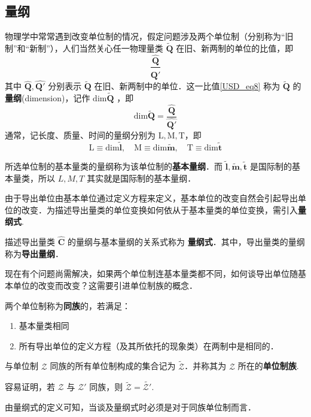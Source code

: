 \subsection{量纲}
物理学中常常遇到改变单位制的情况，假定问题涉及两个单位制（分别称为“旧制”和“新制”），人们当然关心任一物理量类 $\tilde{\boldsymbol{Q}}$ 在旧、新两制的单位的比值，即 
\begin{equation}\label{USD_eq8}
\frac{\hat{\boldsymbol{Q}}}{\hat{\boldsymbol{Q'}}}
\end{equation}
其中 $\hat{\boldsymbol{Q}},\hat{\boldsymbol{Q'}}$ 分别表示 $\tilde{\boldsymbol{Q}}$ 在旧、新两制中的单位．这一比值\autoref{USD_eq8} 称为 $\tilde{\boldsymbol{Q}}$ 的\textbf{量纲}(dimension)，记作 $\mathrm{dim}\tilde{\boldsymbol{Q}}$ ，即
\begin{equation}\label{USD_eq9}
\mathrm{dim}\tilde{\boldsymbol{Q}}=\frac{\hat{\boldsymbol{Q}}}{\hat{\boldsymbol{Q'}}}
\end{equation}
通常，记长度、质量、时间的量纲分别为 $\mathrm{L},\mathrm{M},\mathrm{T}$，即
\begin{equation}
\mathrm{L}\equiv\mathrm{dim}\tilde{\boldsymbol{l}},\quad\mathrm{M}\equiv\mathrm{dim}\tilde{\boldsymbol{m}},\quad
\mathrm{T}\equiv\mathrm{dim}\tilde{\boldsymbol{t}}
\end{equation}

所选单位制的基本量类的量纲称为该单位制的\textbf{基本量纲}．而 $\tilde{\boldsymbol{l}},\tilde{\boldsymbol{m}},\tilde{\boldsymbol{t}}$ 是国际制的基本量类，所以 $L,M,T$ 其实就是国际制的基本量纲．

由于导出单位由基本单位通过定义方程来定义，基本单位的改变自然会引起导出单位的改变．为描述导出量类的单位变换如何依从于基本量类的单位变换，需引入\textbf{量纲式}.
\begin{definition}{}\label{USD_def1}
描述导出量类 $\hat{\boldsymbol{C}}$ 的量纲与基本量纲的关系式称为 \textbf{量纲式}．其中，导出量类的量纲称为\textbf{导出量纲}．
\end{definition}

现在有个问题尚需解决，如果两个单位制连基本量类都不同，如何谈导出单位随基本单位的改变而改变？这需要引进单位制族的概念．
\begin{definition}{}\label{USD_def2}
两个单位制称为\textbf{同族}的，若满足：
\begin{enumerate}
\item 基本量类相同 
\item 所有导出单位的定义方程（及其所依托的现象类）在两制中是相同的．
\end{enumerate}
\end{definition}
与单位制 $\mathscr{Z}$ 同族的所有单位制构成的集合记为 $\tilde{\mathscr{Z}}$．并称其为 $\mathscr{Z}$ 所在的\textbf{单位制族}.

容易证明，若 $\mathscr{Z}$ 与 $\mathscr{Z'}$ 同族，则 $\tilde{\mathscr{Z}}=\tilde{\mathscr{Z'}}$.

由量纲式的定义可知，当谈及量纲式时必须是对于同族单位制而言．